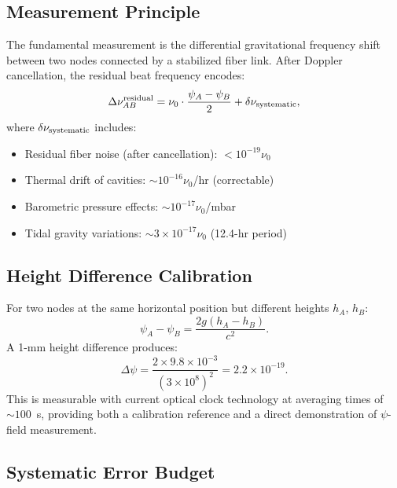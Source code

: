 \documentclass[12pt,letterpaper]{article}
\begin{document}
\subsection{Measurement Principle}

The fundamental measurement is the differential gravitational frequency
shift between two nodes connected by a stabilized fiber link. After
Doppler cancellation, the residual beat frequency encodes:
\begin{equation}
\Delta\nu_{AB}^{\rm residual} = \nu_0 \cdot \frac{\psi_A - \psi_B}{2}
+ \delta\nu_{\rm systematic},
\end{equation}
where $\delta\nu_{\rm systematic}$ includes:
\begin{itemize}
\item Residual fiber noise (after cancellation): $< 10^{-19}\nu_0$
\item Thermal drift of cavities: $\sim 10^{-16}\nu_0$/hr (correctable)
\item Barometric pressure effects: $\sim 10^{-17}\nu_0$/mbar
\item Tidal gravity variations: $\sim 3\times10^{-17}\nu_0$ (12.4-hr period)
\end{itemize}

\subsection{Height Difference Calibration}

For two nodes at the same horizontal position but different heights
$h_A$, $h_B$:
\begin{equation}
\psi_A - \psi_B = \frac{2g(h_A - h_B)}{c^2}.
\end{equation}
A 1-mm height difference produces:
\begin{equation}
\Delta\psi = \frac{2\times 9.8 \times 10^{-3}}{(3\times10^8)^2}
= 2.2\times10^{-19}.
\end{equation}
This is measurable with current optical clock technology at averaging
times of $\sim 100$~s, providing both a calibration reference and a
direct demonstration of $\psi$-field measurement.

\subsection{Systematic Error Budget}
\end{document}
